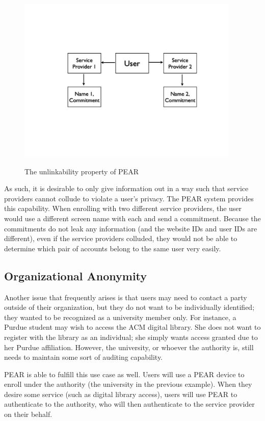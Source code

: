 \begin{figure}[!ht]
\includegraphics[width=400px]{images/pearpics.jpg}
\label{fig:pearunlinkability}
\caption{The unlinkability property of PEAR}
\end{figure}
\FloatBarrier

As such, it is desirable to only give information out in a way such that service providers cannot collude to violate
a user's privacy. The PEAR system provides this capability. When enrolling with two different service providers,
the user would use a different screen name with each and send a commitment. Because the commitments do not
leak any information (and the website IDs and user IDs are different), even if the service providers colluded, they would
not be able to determine which pair of accounts belong to the same user very easily.

\subsection{Organizational Anonymity}
Another issue that frequently arises is that users may need to contact a party outside of their organization, but
they do not want to be individually identified; they wanted to be recognized as a university member only. For instance,
a Purdue student may wish to access the ACM digital library. She does not want to register with the library as an
individual; she simply wants access granted due to her Purdue affiliation.
However, the university, or whoever the authority is, still needs to maintain some sort of auditing capability.

PEAR is able to fulfill this use case as well. Users will use a PEAR device to enroll under the authority (the university
in the previous example). When they desire some service (such as digital library access), users will use PEAR to 
authenticate to the authority, who will then authenticate to the service provider on their behalf.

